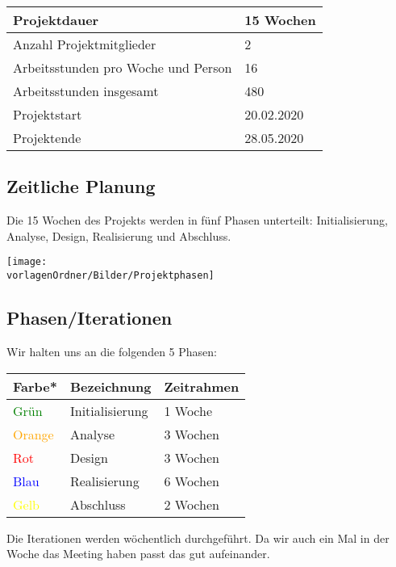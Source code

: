 \documentclass[
	ngerman,
	toc=listof, %
	toc=bibliography, %
	footnotes=multiple, %
	parskip=half, %
	numbers=noendperiod %
]{scrartcl}
\newcommand{\vorlagenOrdner}{../../99_Vorlagen} %
\begin{document}
		\begin{tabularx}{\textwidth}{Xl}
			\midrule
			Projektdauer & 15 Wochen \\
			\midrule
			Anzahl Projektmitglieder & 2 \\
			\midrule
			Arbeitsstunden pro Woche und Person & 16 \\
			\midrule
			Arbeitsstunden insgesamt & 480 \\
			\midrule
			Projektstart & 20.02.2020 \\
			\midrule
			Projektende & 28.05.2020 \\
			\midrule
		\end{tabularx}

	\subsection{Zeitliche Planung}
		Die 15 Wochen des Projekts werden in fünf Phasen unterteilt: Initialisierung, Analyse, Design, Realisierung und Abschluss.
		\begin{center}
			\label{ZeitplanOverview}
			\texttt{[image: \\vorlagenOrdner/Bilder/Projektphasen]}
		\end{center}

	\subsection{Phasen/Iterationen}
		Wir halten uns an die folgenden 5 Phasen: \\
		\begin{tabularx}{\textwidth}{lll}
			\toprule
			Farbe* & Bezeichnung & Zeitrahmen \\
			\midrule
			\textcolor{green}{Grün} & Initialisierung & 1 Woche \\
			\textcolor{orange}{Orange} & Analyse & 3 Wochen \\
			\textcolor{red}{Rot} & Design & 3 Wochen \\
			\textcolor{blue}{Blau} & Realisierung & 6 Wochen \\
			\textcolor{yellow}{Gelb} & Abschluss & 2 Wochen \\
			\bottomrule
		\end{tabularx}
	
		Die Iterationen werden wöchentlich durchgeführt.
		Da wir auch ein Mal in der Woche das Meeting haben passt das gut aufeinander.
\end{document}
